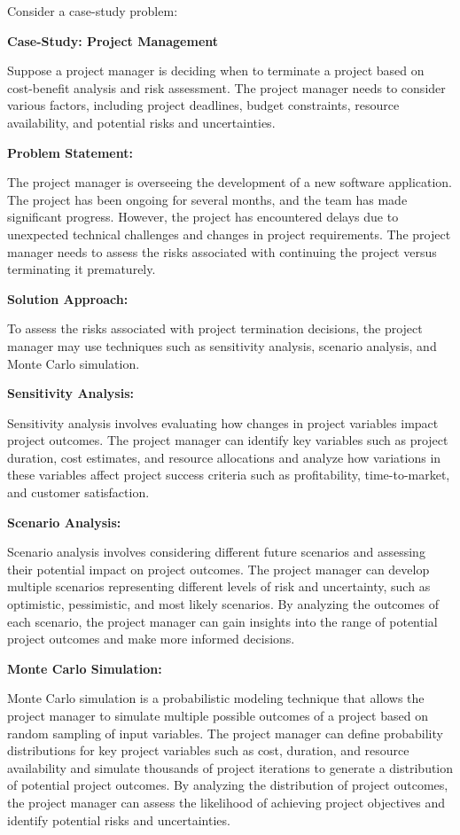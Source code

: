 \documentclass[12pt]{book} %
\begin{document}
Consider a case-study problem:

\textbf{Case-Study: Project Management}

Suppose a project manager is deciding when to terminate a project based on cost-benefit analysis and risk assessment. The project manager needs to consider various factors, including project deadlines, budget constraints, resource availability, and potential risks and uncertainties.

\textbf{Problem Statement:}

The project manager is overseeing the development of a new software application. The project has been ongoing for several months, and the team has made significant progress. However, the project has encountered delays due to unexpected technical challenges and changes in project requirements. The project manager needs to assess the risks associated with continuing the project versus terminating it prematurely.

\textbf{Solution Approach:}

To assess the risks associated with project termination decisions, the project manager may use techniques such as sensitivity analysis, scenario analysis, and Monte Carlo simulation.

\textbf{Sensitivity Analysis:}

Sensitivity analysis involves evaluating how changes in project variables impact project outcomes. The project manager can identify key variables such as project duration, cost estimates, and resource allocations and analyze how variations in these variables affect project success criteria such as profitability, time-to-market, and customer satisfaction.

\textbf{Scenario Analysis:}

Scenario analysis involves considering different future scenarios and assessing their potential impact on project outcomes. The project manager can develop multiple scenarios representing different levels of risk and uncertainty, such as optimistic, pessimistic, and most likely scenarios. By analyzing the outcomes of each scenario, the project manager can gain insights into the range of potential project outcomes and make more informed decisions.

\textbf{Monte Carlo Simulation:}

Monte Carlo simulation is a probabilistic modeling technique that allows the project manager to simulate multiple possible outcomes of a project based on random sampling of input variables. The project manager can define probability distributions for key project variables such as cost, duration, and resource availability and simulate thousands of project iterations to generate a distribution of potential project outcomes. By analyzing the distribution of project outcomes, the project manager can assess the likelihood of achieving project objectives and identify potential risks and uncertainties.
\end{document}
